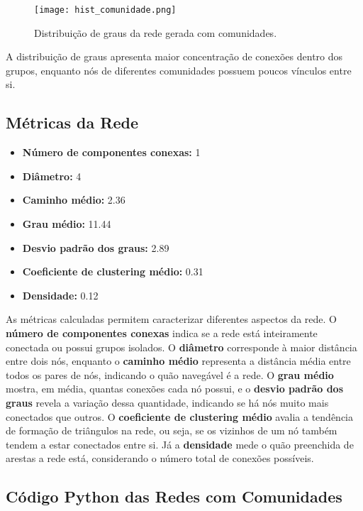 \documentclass{article}
\begin{document}
\begin{figure}[h]
\centering
\texttt{[image: hist\_comunidade.png]}
\caption{Distribuição de graus da rede gerada com comunidades.}
\end{figure}

A distribuição de graus apresenta maior concentração de conexões dentro dos grupos, enquanto nós de diferentes comunidades possuem poucos vínculos entre si.

\subsection*{Métricas da Rede}

\begin{itemize}
    \item \textbf{Número de componentes conexas:} 1
    \item \textbf{Diâmetro:} 4
    \item \textbf{Caminho médio:} 2.36
    \item \textbf{Grau médio:} 11.44
    \item \textbf{Desvio padrão dos graus:} 2.89
    \item \textbf{Coeficiente de clustering médio:} 0.31
    \item \textbf{Densidade:} 0.12
\end{itemize}

As métricas calculadas permitem caracterizar diferentes aspectos da rede. O \textbf{número de componentes conexas} indica se a rede está inteiramente conectada ou possui grupos isolados. O \textbf{diâmetro} corresponde à maior distância entre dois nós, enquanto o \textbf{caminho médio} representa a distância média entre todos os pares de nós, indicando o quão navegável é a rede.
O \textbf{grau médio} mostra, em média, quantas conexões cada nó possui, e o \textbf{desvio padrão dos graus} revela a variação dessa quantidade, indicando se há nós muito mais conectados que outros. O \textbf{coeficiente de clustering médio} avalia a tendência de formação de triângulos na rede, ou seja, se os vizinhos de um nó também tendem a estar conectados entre si. Já a \textbf{densidade} mede o quão preenchida de arestas a rede está, considerando o número total de conexões possíveis.

\subsection{Código Python das Redes com Comunidades}
\end{document}
